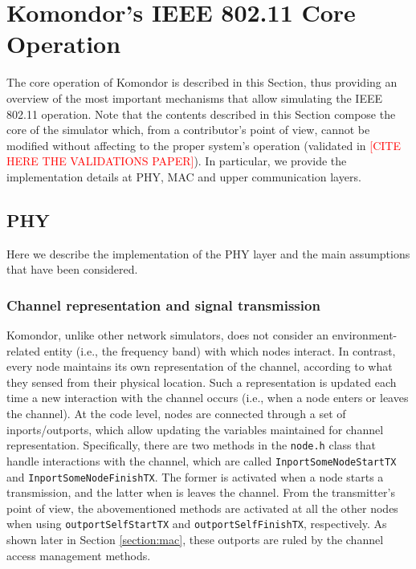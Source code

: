\documentclass[a4paper]{article}
\begin{document}
\section{Komondor's IEEE 802.11 Core Operation}
\label{section:core_operation}
The core operation of Komondor is described in this Section, thus providing an overview of the most important mechanisms that allow simulating the IEEE 802.11 operation. Note that the contents described in this Section compose the core of the simulator which, from a contributor's point of view, cannot be modified without affecting to the proper system's operation (validated in \textcolor{red}{[CITE HERE THE VALIDATIONS PAPER]}). In particular, we provide the implementation details at PHY,  MAC and upper communication layers.

\subsection{PHY}
\label{section:phy}
Here we describe the implementation of the PHY layer and the main assumptions that have been considered.
	
	\subsubsection{Channel representation and signal transmission}	
	Komondor, unlike other network simulators, does not consider an environment-related entity (i.e., the frequency band) with which nodes interact. In contrast, every node maintains its own representation of the channel, according to what they sensed from their physical location. Such a representation is updated each time a new interaction with the channel occurs (i.e., when a node enters or leaves the channel). At the code level, nodes are connected through a set of inports/outports, which allow updating the variables maintained for channel representation. Specifically, there are two methods in the \texttt{node.h} class that handle interactions with the channel, which are called \texttt{InportSomeNodeStartTX} and \texttt{InportSomeNodeFinishTX}. The former is activated when a node starts a transmission, and the latter when is leaves the channel. From the transmitter's point of view, the abovementioned methods are activated at all the other nodes when using \texttt{outportSelfStartTX} and \texttt{outportSelfFinishTX}, respectively. As shown later in Section \ref{section:mac}, these outports are ruled by the channel access management methods.
	
\end{document}
